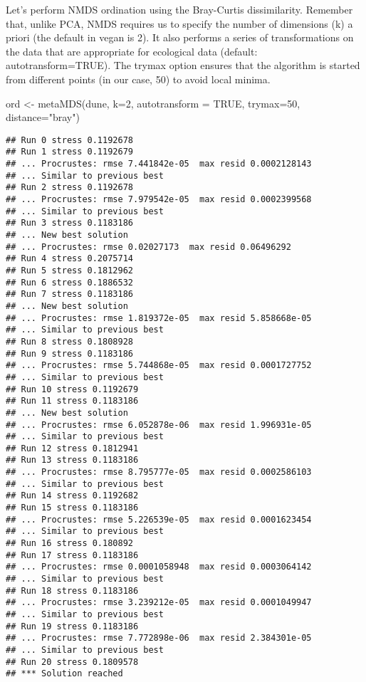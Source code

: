 \documentclass[
]{book}
\newenvironment{Shaded}{\begin{snugshade}}{\end{snugshade}}
\newcommand{\AttributeTok}[1]{\textcolor[rgb]{0.77,0.63,0.00}{#1}}
\newcommand{\ConstantTok}[1]{\textcolor[rgb]{0.00,0.00,0.00}{#1}}
\newcommand{\DecValTok}[1]{\textcolor[rgb]{0.00,0.00,0.81}{#1}}
\newcommand{\FunctionTok}[1]{\textcolor[rgb]{0.00,0.00,0.00}{#1}}
\newcommand{\NormalTok}[1]{#1}
\newcommand{\OtherTok}[1]{\textcolor[rgb]{0.56,0.35,0.01}{#1}}
\newcommand{\StringTok}[1]{\textcolor[rgb]{0.31,0.60,0.02}{#1}}
\begin{document}
Let's perform NMDS ordination using the Bray-Curtis dissimilarity. Remember that, unlike PCA, NMDS requires us to specify the number of dimensions (k) a priori (the default in vegan is 2). It also performs a series of transformations on the data that are appropriate for ecological data (default: autotransform=TRUE). The trymax option ensures that the algorithm is started from different points (in our case, 50) to avoid local minima.

\begin{Shaded}
\begin{Highlighting}[]
\NormalTok{ord }\OtherTok{\textless{}{-}} \FunctionTok{metaMDS}\NormalTok{(dune, }\AttributeTok{k=}\DecValTok{2}\NormalTok{, }\AttributeTok{autotransform =} \ConstantTok{TRUE}\NormalTok{, }\AttributeTok{trymax=}\DecValTok{50}\NormalTok{, }\AttributeTok{distance=}\StringTok{"bray"}\NormalTok{)}
\end{Highlighting}
\end{Shaded}

\begin{verbatim}
## Run 0 stress 0.1192678 
## Run 1 stress 0.1192679 
## ... Procrustes: rmse 7.441842e-05  max resid 0.0002128143 
## ... Similar to previous best
## Run 2 stress 0.1192678 
## ... Procrustes: rmse 7.979542e-05  max resid 0.0002399568 
## ... Similar to previous best
## Run 3 stress 0.1183186 
## ... New best solution
## ... Procrustes: rmse 0.02027173  max resid 0.06496292 
## Run 4 stress 0.2075714 
## Run 5 stress 0.1812962 
## Run 6 stress 0.1886532 
## Run 7 stress 0.1183186 
## ... New best solution
## ... Procrustes: rmse 1.819372e-05  max resid 5.858668e-05 
## ... Similar to previous best
## Run 8 stress 0.1808928 
## Run 9 stress 0.1183186 
## ... Procrustes: rmse 5.744868e-05  max resid 0.0001727752 
## ... Similar to previous best
## Run 10 stress 0.1192679 
## Run 11 stress 0.1183186 
## ... New best solution
## ... Procrustes: rmse 6.052878e-06  max resid 1.996931e-05 
## ... Similar to previous best
## Run 12 stress 0.1812941 
## Run 13 stress 0.1183186 
## ... Procrustes: rmse 8.795777e-05  max resid 0.0002586103 
## ... Similar to previous best
## Run 14 stress 0.1192682 
## Run 15 stress 0.1183186 
## ... Procrustes: rmse 5.226539e-05  max resid 0.0001623454 
## ... Similar to previous best
## Run 16 stress 0.180892 
## Run 17 stress 0.1183186 
## ... Procrustes: rmse 0.0001058948  max resid 0.0003064142 
## ... Similar to previous best
## Run 18 stress 0.1183186 
## ... Procrustes: rmse 3.239212e-05  max resid 0.0001049947 
## ... Similar to previous best
## Run 19 stress 0.1183186 
## ... Procrustes: rmse 7.772898e-06  max resid 2.384301e-05 
## ... Similar to previous best
## Run 20 stress 0.1809578 
## *** Solution reached
\end{verbatim}
\end{document}
